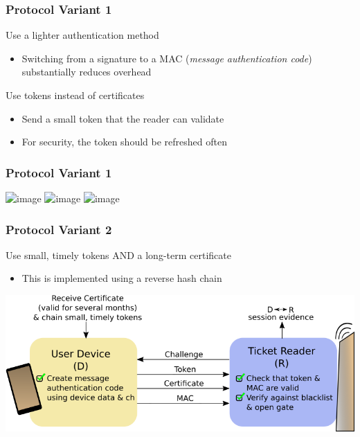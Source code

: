 \documentclass[unknownkeysallowed]{beamer}
\begin{document}
\begin{frame}
\frametitle{Protocol Variant 1}
  \begin{center}
    \begin{block}{Use a lighter authentication method}
      \begin{itemize}
        \pause
        \item{Switching from a signature to a MAC (\textit{message authentication code}) substantially reduces overhead}
        \pause
      \end{itemize}
    \end{block}
    \begin{block}{Use tokens instead of certificates}
      \begin{itemize}
        \pause
        \item{Send a small token that the reader can validate}
        \pause
        \item{For security, the token should be refreshed often}
      \end{itemize}
    \end{block}
  \end{center}
\end{frame}

\begin{frame}
\frametitle{Protocol Variant 1}
\begin{center}
  \includegraphics<1>[width=.8\linewidth,height=.8\textheight,keepaspectratio]{figures/ticketing/protocol45.png}
  \includegraphics<2>[width=.8\linewidth,height=.8\textheight,keepaspectratio]{figures/ticketing/protocol50.png}
  \includegraphics<3>[width=.8\linewidth,height=.8\textheight,keepaspectratio]{figures/ticketing/protocol55.png}
\end{center}
\end{frame}

\begin{frame}
\frametitle{Protocol Variant 2}
  \begin{center}
    \begin{block}{Use small, timely tokens AND a long-term certificate}
      \begin{itemize}
        \pause
        \item{This is implemented using a reverse hash chain}
      \end{itemize}
    \end{block}
    \includegraphics[width=.8\linewidth,height=.8\textheight,keepaspectratio]{figures/ticketing/protocol60.png}
  \end{center}
\end{frame}
\end{document}
